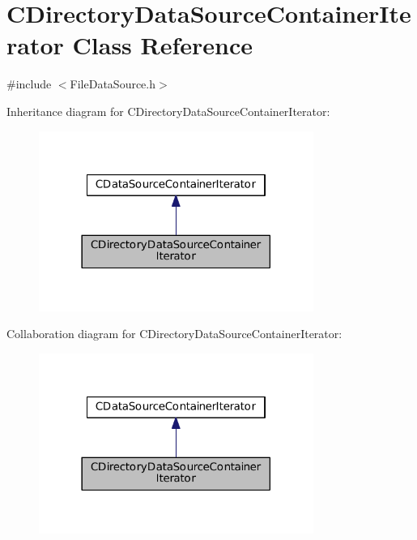 \hypertarget{classCDirectoryDataSourceContainerIterator}{}\section{C\+Directory\+Data\+Source\+Container\+Iterator Class Reference}
\label{classCDirectoryDataSourceContainerIterator}


{\ttfamily \#include $<$File\+Data\+Source.\+h$>$}



Inheritance diagram for C\+Directory\+Data\+Source\+Container\+Iterator\+:
\nopagebreak
\begin{figure}[H]
\begin{center}
\leavevmode
\includegraphics[width=254pt]{classCDirectoryDataSourceContainerIterator__inherit__graph}
\end{center}
\end{figure}


Collaboration diagram for C\+Directory\+Data\+Source\+Container\+Iterator\+:
\nopagebreak
\begin{figure}[H]
\begin{center}
\leavevmode
\includegraphics[width=254pt]{classCDirectoryDataSourceContainerIterator__coll__graph}
\end{center}
\end{figure}
